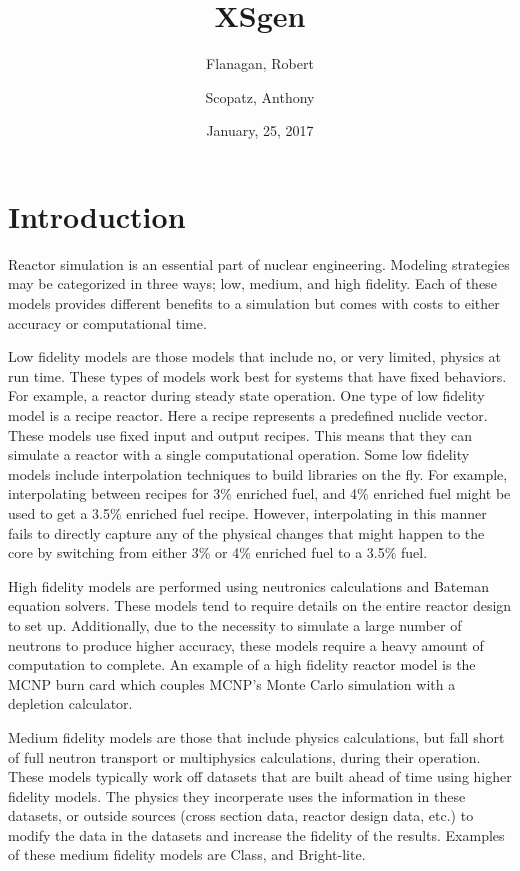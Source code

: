 \documentclass{article}
\begin{document}
\title{XSgen}
\date{January, 25, 2017}
\author{Flanagan, Robert \and Scopatz, Anthony}
\maketitle
\onehalfspacing

\section{Introduction}
Reactor simulation is an essential part of nuclear engineering. Modeling strategies may be categorized in three ways; low, medium, and high fidelity. Each of these models provides different benefits to a simulation but comes with costs to either accuracy or computational time.

Low fidelity models are those models that include no, or very limited,  physics at run time. These types of models work best for systems that have fixed behaviors. For example, a reactor during steady state operation. One type of low fidelity model is a recipe reactor. Here a recipe represents a predefined nuclide vector. These models use fixed input and output recipes. This means that they can simulate a reactor with a single computational operation. Some low fidelity models include interpolation techniques to build libraries on the fly. For example, interpolating between recipes for 3\% enriched fuel, and 4\% enriched fuel might be used to get a 3.5\% enriched fuel recipe. However, interpolating in this manner fails to directly capture any of the physical changes that might happen to the core by switching from either 3\% or 4\% enriched fuel to a 3.5\% fuel.

High fidelity models are performed using neutronics calculations and Bateman equation\cite{Bateman} solvers. These models tend to require details on the entire reactor design to set up. Additionally, due to the necessity to simulate a large number of neutrons to produce higher accuracy, these models require a heavy amount of computation to complete. An example of a high fidelity reactor model is the MCNP\cite{mcnp5monte} burn card which couples MCNP's Monte Carlo simulation with a depletion calculator.

Medium fidelity models are those that include physics calculations, but fall short of full neutron transport or multiphysics calculations, during their operation. These models typically work off datasets that are built ahead of time using higher fidelity models. The physics they incorperate uses the information in these datasets, or outside sources (cross section data, reactor design data, etc.) to modify the data in the datasets and increase the fidelity of the results. Examples of these medium fidelity models are Class\cite{class}, and Bright-lite\cite{brightlite}\cite{flanagan}.
\end{document}
